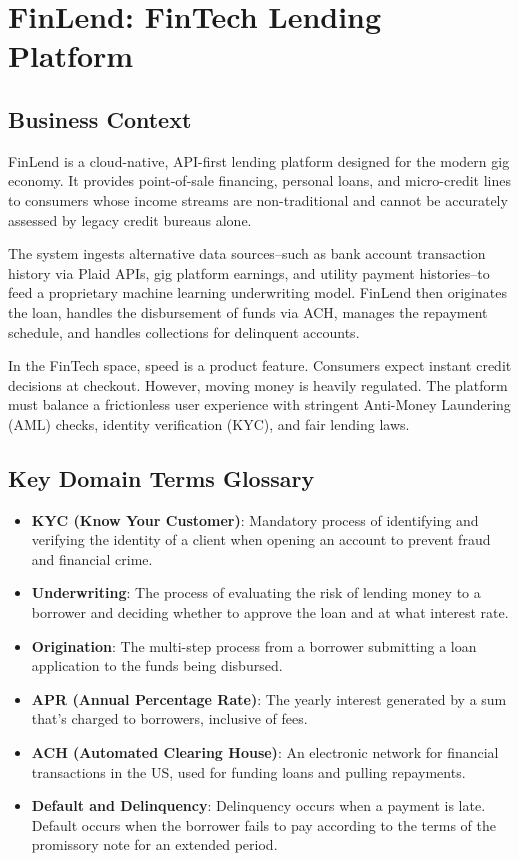 \documentclass[
  11pt,
  openany,
  oneside]{book}
\providecommand{\tightlist}{%
  \setlength{\itemsep}{0pt}\setlength{\parskip}{0pt}}
\begin{document}
\bigskip

\section{FinLend: FinTech Lending
Platform}\label{finlend-fintech-lending-platform}

\subsection{Business Context}\label{business-context-1}

FinLend is a cloud-native, API-first lending platform designed for the
modern gig economy. It provides point-of-sale financing, personal loans,
and micro-credit lines to consumers whose income streams are
non-traditional and cannot be accurately assessed by legacy credit
bureaus alone.

The system ingests alternative data sources--such as bank account
transaction history via Plaid APIs, gig platform earnings, and utility
payment histories--to feed a proprietary machine learning underwriting
model. FinLend then originates the loan, handles the disbursement of
funds via ACH, manages the repayment schedule, and handles collections
for delinquent accounts.

In the FinTech space, speed is a product feature. Consumers expect
instant credit decisions at checkout. However, moving money is heavily
regulated. The platform must balance a frictionless user experience with
stringent Anti-Money Laundering (AML) checks, identity verification
(KYC), and fair lending laws.

\subsection{Key Domain Terms
Glossary}\label{key-domain-terms-glossary-1}

\begin{itemize}
\tightlist
\item
  \textbf{KYC (Know Your Customer)}: Mandatory process of identifying
  and verifying the identity of a client when opening an account to
  prevent fraud and financial crime.
\item
  \textbf{Underwriting}: The process of evaluating the risk of lending
  money to a borrower and deciding whether to approve the loan and at
  what interest rate.
\item
  \textbf{Origination}: The multi-step process from a borrower
  submitting a loan application to the funds being disbursed.
\item
  \textbf{APR (Annual Percentage Rate)}: The yearly interest generated
  by a sum that's charged to borrowers, inclusive of fees.
\item
  \textbf{ACH (Automated Clearing House)}: An electronic network for
  financial transactions in the US, used for funding loans and pulling
  repayments.
\item
  \textbf{Default and Delinquency}: Delinquency occurs when a payment is
  late. Default occurs when the borrower fails to pay according to the
  terms of the promissory note for an extended period.
\end{itemize}
\end{document}
